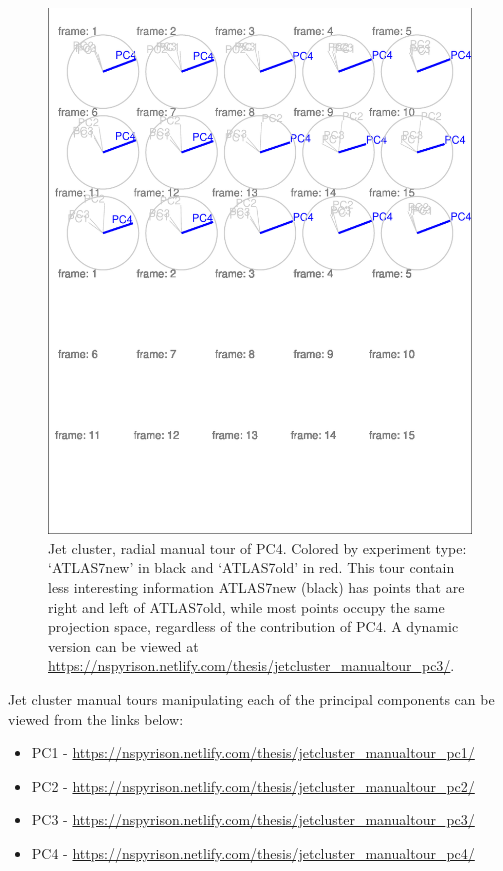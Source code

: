 \documentclass{monashthesis}
\begin{document}
\begin{figure}
\centering
\includegraphics{thesis_files/figure-latex/JetClusterBad-1.pdf}
\caption{\label{fig:JetClusterBad}Jet cluster, radial manual tour of PC4. Colored by experiment type: `ATLAS7new' in black and `ATLAS7old' in red. This tour contain less interesting information ATLAS7new (black) has points that are right and left of ATLAS7old, while most points occupy the same projection space, regardless of the contribution of PC4. A dynamic version can be viewed at \url{https://nspyrison.netlify.com/thesis/jetcluster_manualtour_pc3/}.}
\end{figure}

Jet cluster manual tours manipulating each of the principal components can be viewed from the links below:

\begin{itemize}
\tightlist
\item
  PC1 - \url{https://nspyrison.netlify.com/thesis/jetcluster_manualtour_pc1/}
\item
  PC2 - \url{https://nspyrison.netlify.com/thesis/jetcluster_manualtour_pc2/}
\item
  PC3 - \url{https://nspyrison.netlify.com/thesis/jetcluster_manualtour_pc3/}
\item
  PC4 - \url{https://nspyrison.netlify.com/thesis/jetcluster_manualtour_pc4/}
\end{itemize}
\end{document}
